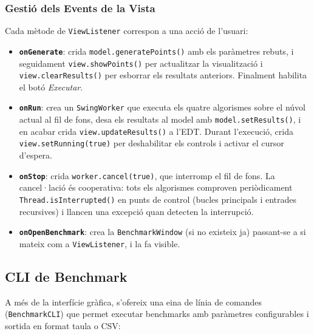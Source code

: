 \documentclass[conference,compsoc]{IEEEtran}
\begin{document}
\subsubsection{Gestió dels Events de la Vista}

Cada mètode de \texttt{ViewListener} correspon a una acció de l'usuari:

\begin{itemize}
    \item \textbf{\texttt{onGenerate}}: crida \texttt{model.generatePoints()}
          amb els paràmetres rebuts, i seguidament
          \texttt{view.showPoints()} per actualitzar la visualització i
          \texttt{view.clearResults()} per esborrar els resultats anteriors.
          Finalment habilita el botó \textit{Executar}.

    \item \textbf{\texttt{onRun}}: crea un \texttt{SwingWorker} que
          executa els quatre algorismes sobre el núvol actual al fil de
          fons, desa els resultats al model amb \texttt{model.setResults()},
          i en acabar crida \texttt{view.updateResults()} a l'EDT.
          Durant l'execució, crida \texttt{view.setRunning(true)} per
          deshabilitar els controls i activar el cursor d'espera.

    \item \textbf{\texttt{onStop}}: crida \texttt{worker.cancel(true)},
          que interromp el fil de fons. La cancel·lació és cooperativa:
          tots els algorismes comproven periòdicament
          \texttt{Thread.isInterrupted()} en punts de control
          (bucles principals i entrades recursives) i llancen una
          excepció quan detecten la interrupció.

    \item \textbf{\texttt{onOpenBenchmark}}: crea la \texttt{BenchmarkWindow}
          (si no existeix ja) passant-se a si mateix com a
          \texttt{ViewListener}, i la fa visible.
\end{itemize}

\subsection{CLI de Benchmark}

A més de la interfície gràfica, s'ofereix una eina de línia de
comandes (\texttt{BenchmarkCLI}) que permet executar benchmarks
amb paràmetres configurables i sortida en format taula o CSV:
\end{document}
